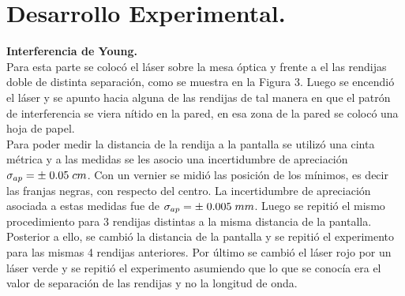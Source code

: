 \documentclass[DIV=calc, paper=a4, fontsize=10.5pt]{scrartcl}
\begin{document}
\section*{\textcolor{carmine}{Desarrollo Experimental.}}
\textbf{\textcolor{carmine}{Interferencia de Young.}}\\
Para esta parte se colocó el láser sobre la mesa óptica y frente a el las rendijas doble de distinta separación, como se muestra en la Figura 3. Luego se encendió el láser y se apunto hacia alguna de las rendijas de tal manera en que  el patrón de interferencia se viera nítido en la pared, en esa zona de la pared se colocó una hoja de papel.\\ Para poder medir la distancia de la rendija a la pantalla se utilizó una cinta métrica y a las medidas se les asocio una incertidumbre de apreciación $\sigma_{ap}=\pm\hspace{0.1cm}0.05\hspace{0.1cm}cm$. Con un vernier se midió las posición de los mínimos, es decir las franjas negras, con respecto del centro. La incertidumbre de apreciación asociada a estas medidas fue de $\sigma_{ap}=\pm\hspace{0.1cm}0.005\hspace{0.1cm}mm$. Luego se repitió el mismo procedimiento para 3 rendijas distintas a la misma distancia de la pantalla. Posterior a ello, se cambió la distancia de la pantalla y se repitió el experimento para las mismas 4 rendijas anteriores. Por último se cambió el láser rojo por un láser verde y se repitió el experimento asumiendo que lo que se conocía era el valor de separación de las rendijas y no la longitud de onda.
\end{document}

